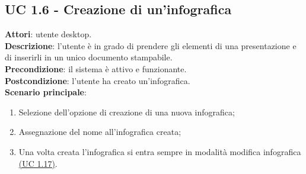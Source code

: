 \subsection{UC 1.6 - Creazione di un'infografica}{
	\label{uc1.6}
	\textbf{Attori}: utente desktop. \\
	\textbf{Descrizione}: l'utente è in grado di prendere gli elementi di una presentazione e di inserirli in un unico documento stampabile. \\
	\textbf{Precondizione}: il sistema è attivo e funzionante.	\\
	\textbf{Postcondizione}: l'utente ha creato un'infografica.	\\
	\textbf{Scenario principale}:
	\begin{enumerate}
		\item Selezione dell'opzione di creazione di una nuova infografica;
		\item Assegnazione del nome all'infografica creata;
		\item Una volta creata l'infografica si entra sempre in modalità modifica infografica \hyperref[uc1.17]{(UC 1.17)}.
	\end{enumerate}
	}
